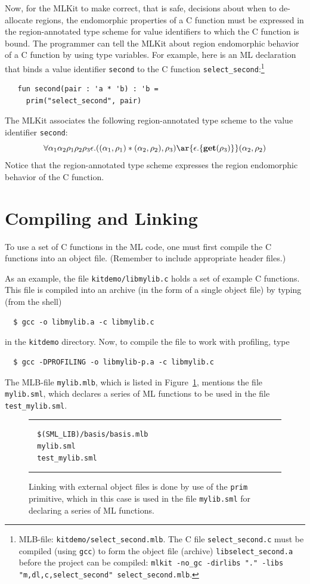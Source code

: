 \documentclass[12pt]{book}
\begin{document}
Now, for the MLKit to make correct, that is safe, decisions about when
to de-allocate regions, the endomorphic properties of a C function
must be expressed in the region-annotated type scheme for value identifiers
to which the C function is bound. The programmer can tell the MLKit
about region endomorphic behavior of a C function by using type
variables.  For example, here is an ML declaration that binds a value
identifier {\tt second} to the C function
\verb|select_second|:\footnote{MLB-file: {\tt kitdemo/select\_second.mlb}. The C
  file {\tt select\_second.c} must be compiled (using {\tt gcc}) to
  form the object file (archive) {\tt libselect\_second.a} before the project can
  be compiled: \texttt{mlkit -no\_gc -dirlibs "." -libs "m,dl,c,select\_second" select\_second.mlb}.}
\begin{verbatim}
   fun second(pair : 'a * 'b) : 'b =
     prim("select_second", pair)
\end{verbatim}
The MLKit associates the following region-annotated type scheme to the value
identifier {\tt second}:
$$\forall \alpha_1\alpha_2\rho_1\rho_2\rho_3\epsilon.((\alpha_1,
\rho_1) * (\alpha_2, \rho_2), \rho_3) \ar{\epsilon.\{\Get(\rho_3)\}} (\alpha_2,
\rho_2)$$
Notice that the region-annotated type scheme expresses the region endomorphic
behavior of the C function.

 
\section{Compiling and Linking}
\label{comp_and_link_with_C.sec}
To use a set of C functions in the ML code, one must first compile the
C functions into an object file. (Remember to include appropriate
header files.)

As an example, the file \verb|kitdemo/libmylib.c| holds a set of
example C functions. This file is compiled into an archive (in the
form of a single object file) by typing (from the shell)
\begin{verbatim}
  $ gcc -o libmylib.a -c libmylib.c
\end{verbatim}
in the {\tt kitdemo} directory. Now, to compile the file to work with
profiling, type
\begin{verbatim}
  $ gcc -DPROFILING -o libmylib-p.a -c libmylib.c
\end{verbatim}

The MLB-file \verb|mylib.mlb|, which is listed in
Figure~\ref{mylib.mlb.fig}, mentions the file \verb|mylib.sml|, which
declares a series of ML functions to be used in the file
\verb|test_mylib.sml|.
\begin{figure}
\hrule \medskip
\begin{verbatim}
  $(SML_LIB)/basis/basis.mlb
  mylib.sml 
  test_mylib.sml
\end{verbatim}
\caption{Linking with external object files is done by use of the 
  \texttt{prim} primitive, which in this case is used in the file
  \texttt{mylib.sml} for declaring a series of ML functions.}
\label{mylib.mlb.fig}
\medskip \hrule
\end{figure}
\end{document}
